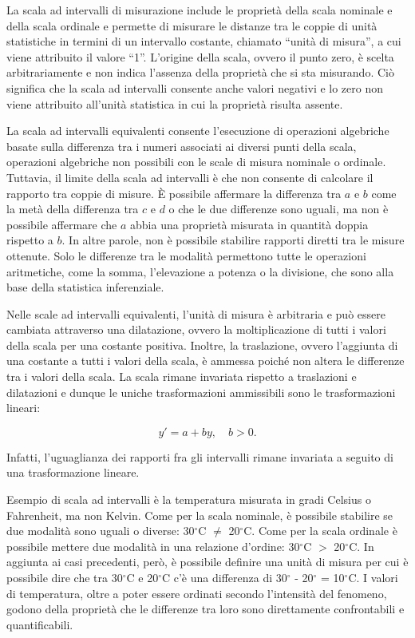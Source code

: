 \documentclass[
  letterpaper,
  krantz2]{{[}./krantz{]}}
\begin{document}
La scala ad intervalli di misurazione include le proprietà della scala
nominale e della scala ordinale e permette di misurare le distanze tra
le coppie di unità statistiche in termini di un intervallo costante,
chiamato ``unità di misura'', a cui viene attribuito il valore ``1''.
L'origine della scala, ovvero il punto zero, è scelta arbitrariamente e
non indica l'assenza della proprietà che si sta misurando. Ciò significa
che la scala ad intervalli consente anche valori negativi e lo zero non
viene attribuito all'unità statistica in cui la proprietà risulta
assente.

La scala ad intervalli equivalenti consente l'esecuzione di operazioni
algebriche basate sulla differenza tra i numeri associati ai diversi
punti della scala, operazioni algebriche non possibili con le scale di
misura nominale o ordinale. Tuttavia, il limite della scala ad
intervalli è che non consente di calcolare il rapporto tra coppie di
misure. È possibile affermare la differenza tra \(a\) e \(b\) come la
metà della differenza tra \(c\) e \(d\) o che le due differenze sono
uguali, ma non è possibile affermare che \(a\) abbia una proprietà
misurata in quantità doppia rispetto a \(b\). In altre parole, non è
possibile stabilire rapporti diretti tra le misure ottenute. Solo le
differenze tra le modalità permettono tutte le operazioni aritmetiche,
come la somma, l'elevazione a potenza o la divisione, che sono alla base
della statistica inferenziale.

Nelle scale ad intervalli equivalenti, l'unità di misura è arbitraria e
può essere cambiata attraverso una dilatazione, ovvero la
moltiplicazione di tutti i valori della scala per una costante positiva.
Inoltre, la traslazione, ovvero l'aggiunta di una costante a tutti i
valori della scala, è ammessa poiché non altera le differenze tra i
valori della scala. La scala rimane invariata rispetto a traslazioni e
dilatazioni e dunque le uniche trasformazioni ammissibili sono le
trasformazioni lineari:

\[
y' = a + by, \quad b > 0.
\]

Infatti, l'uguaglianza dei rapporti fra gli intervalli rimane invariata
a seguito di una trasformazione lineare.

Esempio di scala ad intervalli è la temperatura misurata in gradi
Celsius o Fahrenheit, ma non Kelvin. Come per la scala nominale, è
possibile stabilire se due modalità sono uguali o diverse: 30\(^\circ\)C
\(\neq\) 20\(^\circ\)C. Come per la scala ordinale è possibile mettere
due modalità in una relazione d'ordine: 30\(^\circ\)C \(>\)
20\(^\circ\)C. In aggiunta ai casi precedenti, però, è possibile
definire una unità di misura per cui è possibile dire che tra
30\(^\circ\)C e 20\(^\circ\)C c'è una differenza di 30\(^\circ\) -
20\(^\circ\) = 10\(^\circ\)C. I valori di temperatura, oltre a poter
essere ordinati secondo l'intensità del fenomeno, godono della proprietà
che le differenze tra loro sono direttamente confrontabili e
quantificabili.
\end{document}
